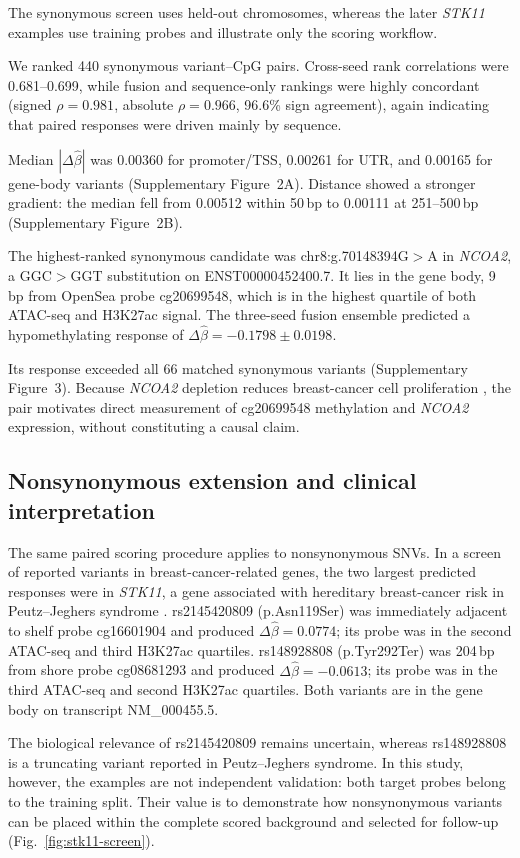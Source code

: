 \documentclass[10pt,letterpaper,twocolumn]{article}
\begin{document}
{\color{addedred}
The synonymous screen uses held-out chromosomes, whereas the later
\textit{STK11} examples use training probes and illustrate only the scoring
workflow.
}

We ranked 440 synonymous variant--CpG pairs. Cross-seed rank correlations were
0.681--0.699, while fusion and sequence-only rankings were highly concordant
(signed $\rho=0.981$, absolute $\rho=0.966$, 96.6\% sign agreement), again
indicating that paired responses were driven mainly by sequence.

Median $|\Delta\widehat\beta|$ was 0.00360 for promoter/TSS, 0.00261 for UTR,
and 0.00165 for gene-body variants (Supplementary Figure~2A). Distance
showed a stronger gradient: the median fell from 0.00512 within 50\,bp to 0.00111
at 251--500\,bp (Supplementary Figure~2B).



{\color{addedred}
The highest-ranked synonymous candidate was chr8:g.70148394G$>$A in
\textit{NCOA2}, a GGC$>$GGT substitution on ENST00000452400.7. It lies in the
gene body, 9\,bp from OpenSea probe cg20699548, which is in the highest quartile
of both ATAC-seq and H3K27ac signal. The three-seed fusion ensemble predicted a
hypomethylating response of $\Delta\widehat\beta=-0.1798\pm0.0198$.

Its response exceeded all 66 matched synonymous variants
(Supplementary Figure~3). Because \textit{NCOA2} depletion reduces
breast-cancer cell proliferation \cite{cai2019ncoa2}, the pair motivates direct
measurement of cg20699548 methylation and \textit{NCOA2} expression, without
constituting a causal claim.
}



\subsection{Nonsynonymous extension and clinical interpretation}

{\color{addedred}
The same paired scoring procedure applies to nonsynonymous SNVs. In a screen of
reported variants in breast-cancer-related genes, the two largest predicted
responses were in \textit{STK11}, a gene associated with hereditary breast-cancer
risk in Peutz--Jeghers syndrome \cite{lipsa2019stk11}. rs2145420809
(p.Asn119Ser) was immediately adjacent to shelf probe cg16601904 and produced
$\Delta\widehat\beta=0.0774$; its probe was in the second ATAC-seq and third
H3K27ac quartiles. rs148928808 (p.Tyr292Ter) was 204\,bp from shore probe
cg08681293 and produced $\Delta\widehat\beta=-0.0613$; its probe was in the
third ATAC-seq and second H3K27ac quartiles. Both variants are in the gene body
on transcript NM\_000455.5.

The biological relevance of rs2145420809 remains uncertain, whereas
rs148928808 is a truncating variant reported in Peutz--Jeghers syndrome. In this
study, however, the examples are not independent validation: both target probes
belong to the training split. Their value is to demonstrate how nonsynonymous
variants can be placed within the complete scored background and selected for
follow-up (Fig.~\ref{fig:stk11-screen}).
}
\end{document}
